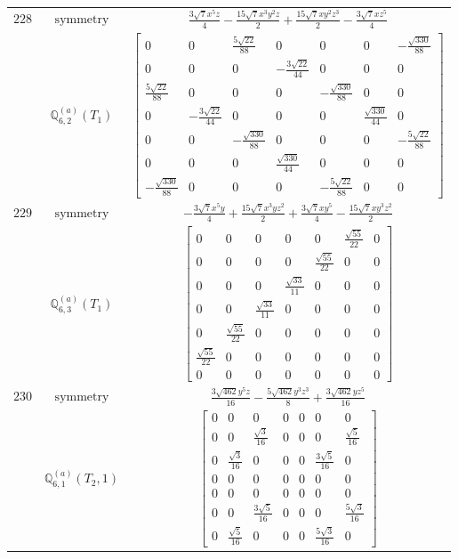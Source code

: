 \documentclass[fleqn,8pt,landscape]{jsarticle}
\begin{document}
\begin{longtable}{ccc}
$ 228 $ & $ \text{symmetry} $ & $ \frac{3 \sqrt{7} x^{5} z}{4} - \frac{15 \sqrt{7} x^{3} y^{2} z}{2} + \frac{15 \sqrt{7} x y^{2} z^{3}}{2} - \frac{3 \sqrt{7} x z^{5}}{4} $ \\
$  $ & $ \mathbb{Q}_{6,2}^{(a)}(T_{1}) $ & $ \begin{bmatrix} 0 & 0 & \frac{5 \sqrt{22}}{88} & 0 & 0 & 0 & - \frac{\sqrt{330}}{88} \\ 0 & 0 & 0 & - \frac{3 \sqrt{22}}{44} & 0 & 0 & 0 \\ \frac{5 \sqrt{22}}{88} & 0 & 0 & 0 & - \frac{\sqrt{330}}{88} & 0 & 0 \\ 0 & - \frac{3 \sqrt{22}}{44} & 0 & 0 & 0 & \frac{\sqrt{330}}{44} & 0 \\ 0 & 0 & - \frac{\sqrt{330}}{88} & 0 & 0 & 0 & - \frac{5 \sqrt{22}}{88} \\ 0 & 0 & 0 & \frac{\sqrt{330}}{44} & 0 & 0 & 0 \\ - \frac{\sqrt{330}}{88} & 0 & 0 & 0 & - \frac{5 \sqrt{22}}{88} & 0 & 0 \end{bmatrix} $ \\ \hline
$ 229 $ & $ \text{symmetry} $ & $ - \frac{3 \sqrt{7} x^{5} y}{4} + \frac{15 \sqrt{7} x^{3} y z^{2}}{2} + \frac{3 \sqrt{7} x y^{5}}{4} - \frac{15 \sqrt{7} x y^{3} z^{2}}{2} $ \\
$  $ & $ \mathbb{Q}_{6,3}^{(a)}(T_{1}) $ & $ \begin{bmatrix} 0 & 0 & 0 & 0 & 0 & \frac{\sqrt{55}}{22} & 0 \\ 0 & 0 & 0 & 0 & \frac{\sqrt{55}}{22} & 0 & 0 \\ 0 & 0 & 0 & \frac{\sqrt{33}}{11} & 0 & 0 & 0 \\ 0 & 0 & \frac{\sqrt{33}}{11} & 0 & 0 & 0 & 0 \\ 0 & \frac{\sqrt{55}}{22} & 0 & 0 & 0 & 0 & 0 \\ \frac{\sqrt{55}}{22} & 0 & 0 & 0 & 0 & 0 & 0 \\ 0 & 0 & 0 & 0 & 0 & 0 & 0 \end{bmatrix} $ \\ \hline
$ 230 $ & $ \text{symmetry} $ & $ \frac{3 \sqrt{462} y^{5} z}{16} - \frac{5 \sqrt{462} y^{3} z^{3}}{8} + \frac{3 \sqrt{462} y z^{5}}{16} $ \\
$  $ & $ \mathbb{Q}_{6,1}^{(a)}(T_{2},1) $ & $ \begin{bmatrix} 0 & 0 & 0 & 0 & 0 & 0 & 0 \\ 0 & 0 & \frac{\sqrt{3}}{16} & 0 & 0 & 0 & \frac{\sqrt{5}}{16} \\ 0 & \frac{\sqrt{3}}{16} & 0 & 0 & 0 & \frac{3 \sqrt{5}}{16} & 0 \\ 0 & 0 & 0 & 0 & 0 & 0 & 0 \\ 0 & 0 & 0 & 0 & 0 & 0 & 0 \\ 0 & 0 & \frac{3 \sqrt{5}}{16} & 0 & 0 & 0 & \frac{5 \sqrt{3}}{16} \\ 0 & \frac{\sqrt{5}}{16} & 0 & 0 & 0 & \frac{5 \sqrt{3}}{16} & 0 \end{bmatrix} $ \\ \hline

\end{longtable}
\end{document}
